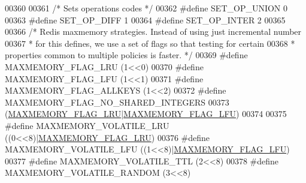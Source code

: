 \begin{DoxyCode}
{{{{{{00360 
00361 \textcolor{comment}{/* Sets operations codes */}
00362 \textcolor{preprocessor}{#}\textcolor{preprocessor}{define} \textcolor{preprocessor}{SET\_OP\_UNION} 0
00363 \textcolor{preprocessor}{#}\textcolor{preprocessor}{define} \textcolor{preprocessor}{SET\_OP\_DIFF} 1
00364 \textcolor{preprocessor}{#}\textcolor{preprocessor}{define} \textcolor{preprocessor}{SET\_OP\_INTER} 2
00365 
00366 \textcolor{comment}{/* Redis maxmemory strategies. Instead of using just incremental number}
00367 \textcolor{comment}{ * for this defines, we use a set of flags so that testing for certain}
00368 \textcolor{comment}{ * properties common to multiple policies is faster. */}
00369 \textcolor{preprocessor}{#}\textcolor{preprocessor}{define} \textcolor{preprocessor}{MAXMEMORY\_FLAG\_LRU} \textcolor{preprocessor}{(}1\textcolor{preprocessor}{<<}0\textcolor{preprocessor}{)}
00370 \textcolor{preprocessor}{#}\textcolor{preprocessor}{define} \textcolor{preprocessor}{MAXMEMORY\_FLAG\_LFU} \textcolor{preprocessor}{(}1\textcolor{preprocessor}{<<}1\textcolor{preprocessor}{)}
00371 \textcolor{preprocessor}{#}\textcolor{preprocessor}{define} \textcolor{preprocessor}{MAXMEMORY\_FLAG\_ALLKEYS} \textcolor{preprocessor}{(}1\textcolor{preprocessor}{<<}2\textcolor{preprocessor}{)}
00372 \textcolor{preprocessor}{#}\textcolor{preprocessor}{define} \textcolor{preprocessor}{MAXMEMORY\_FLAG\_NO\_SHARED\_INTEGERS}
00373     \textcolor{preprocessor}{(}\hyperlink{server_8h_a9f9503e7c7ba52df66b097c2b0b4c6d0}{MAXMEMORY\_FLAG\_LRU}\textcolor{preprocessor}{|}\hyperlink{server_8h_aac2d3ad7a604f87e06e25233dbd01c9b}{MAXMEMORY\_FLAG\_LFU}\textcolor{preprocessor}{)}
00374 
00375 \textcolor{preprocessor}{#}\textcolor{preprocessor}{define} \textcolor{preprocessor}{MAXMEMORY\_VOLATILE\_LRU} \textcolor{preprocessor}{(}\textcolor{preprocessor}{(}0\textcolor{preprocessor}{<<}8\textcolor{preprocessor}{)}\textcolor{preprocessor}{|}\hyperlink{server_8h_a9f9503e7c7ba52df66b097c2b0b4c6d0}{MAXMEMORY\_FLAG\_LRU}\textcolor{preprocessor}{)}
00376 \textcolor{preprocessor}{#}\textcolor{preprocessor}{define} \textcolor{preprocessor}{MAXMEMORY\_VOLATILE\_LFU} \textcolor{preprocessor}{(}\textcolor{preprocessor}{(}1\textcolor{preprocessor}{<<}8\textcolor{preprocessor}{)}\textcolor{preprocessor}{|}\hyperlink{server_8h_aac2d3ad7a604f87e06e25233dbd01c9b}{MAXMEMORY\_FLAG\_LFU}\textcolor{preprocessor}{)}
00377 \textcolor{preprocessor}{#}\textcolor{preprocessor}{define} \textcolor{preprocessor}{MAXMEMORY\_VOLATILE\_TTL} \textcolor{preprocessor}{(}2\textcolor{preprocessor}{<<}8\textcolor{preprocessor}{)}
00378 \textcolor{preprocessor}{#}\textcolor{preprocessor}{define} \textcolor{preprocessor}{MAXMEMORY\_VOLATILE\_RANDOM} \textcolor{preprocessor}{(}3\textcolor{preprocessor}{<<}8\textcolor{preprocessor}{)}
}}}}}}
\end{DoxyCode}
